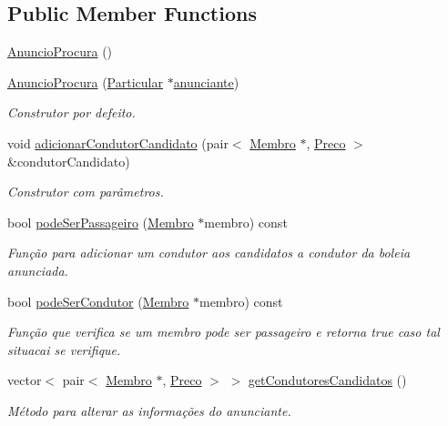 \subsection*{Public Member Functions}
\begin{DoxyCompactItemize}
\item 
\hyperlink{class_anuncio_procura_af0d631aecbb747fb64ad8a80f50944b0}{Anuncio\+Procura} ()
\item 
\hyperlink{class_anuncio_procura_a03743cdc7492d168d554b8dcd56982aa}{Anuncio\+Procura} (\hyperlink{class_particular}{Particular} $\ast$\hyperlink{class_anuncio_a58250bfc8ab82d4308839b1e26213a0f}{anunciante})
\begin{DoxyCompactList}\small\item\em Construtor por defeito. \end{DoxyCompactList}\item 
void \hyperlink{class_anuncio_procura_a1aede1a94eb45ff994d537379091077c}{adicionar\+Condutor\+Candidato} (pair$<$ \hyperlink{class_membro}{Membro} $\ast$, \hyperlink{class_preco}{Preco} $>$ \&condutor\+Candidato)
\begin{DoxyCompactList}\small\item\em Construtor com parâmetros. \end{DoxyCompactList}\item 
bool \hyperlink{class_anuncio_procura_aab615cb1457ec3784d55149d44cdc458}{pode\+Ser\+Passageiro} (\hyperlink{class_membro}{Membro} $\ast$membro) const 
\begin{DoxyCompactList}\small\item\em Função para adicionar um condutor aos candidatos a condutor da boleia anunciada. \end{DoxyCompactList}\item 
bool \hyperlink{class_anuncio_procura_aa7689f1ae7175e99b144c48422231e17}{pode\+Ser\+Condutor} (\hyperlink{class_membro}{Membro} $\ast$membro) const 
\begin{DoxyCompactList}\small\item\em Função que verifica se um membro pode ser passageiro e retorna true caso tal situacai se verifique. \end{DoxyCompactList}\item 
vector$<$ pair$<$ \hyperlink{class_membro}{Membro} $\ast$, \hyperlink{class_preco}{Preco} $>$ $>$ \hyperlink{class_anuncio_procura_a8149478f041f545ce8ccb8958d39cfbd}{get\+Condutores\+Candidatos} ()
\begin{DoxyCompactList}\small\item\em Método para alterar as informações do anunciante. \end{DoxyCompactList}\item 

\end{DoxyCompactItemize}
